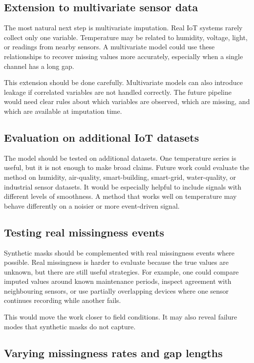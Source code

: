 \subsection{Extension to multivariate sensor data}

The most natural next step is multivariate imputation. Real IoT systems rarely collect only one variable. Temperature may be related to humidity, voltage, light, or readings from nearby sensors. A multivariate model could use these relationships to recover missing values more accurately, especially when a single channel has a long gap.

This extension should be done carefully. Multivariate models can also introduce leakage if correlated variables are not handled correctly. The future pipeline would need clear rules about which variables are observed, which are missing, and which are available at imputation time.

\subsection{Evaluation on additional IoT datasets}

The model should be tested on additional datasets. One temperature series is useful, but it is not enough to make broad claims. Future work could evaluate the method on humidity, air-quality, smart-building, smart-grid, water-quality, or industrial sensor datasets. It would be especially helpful to include signals with different levels of smoothness. A method that works well on temperature may behave differently on a noisier or more event-driven signal.

\subsection{Testing real missingness events}

Synthetic masks should be complemented with real missingness events where possible. Real missingness is harder to evaluate because the true values are unknown, but there are still useful strategies. For example, one could compare imputed values around known maintenance periods, inspect agreement with neighbouring sensors, or use partially overlapping devices where one sensor continues recording while another fails.

This would move the work closer to field conditions. It may also reveal failure modes that synthetic masks do not capture.

\subsection{Varying missingness rates and gap lengths}

